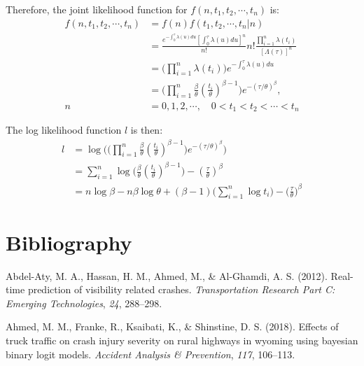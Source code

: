 \documentclass[12pt]{book}
\numberwithin{equation}{chapter}
\begin{document}
Therefore, the joint likelihood function for \(f(n, t_1, t_2, \cdots, t_n)\) is:
\begin{equation}
\begin{aligned}
f(n, t_1, t_2, \cdots, t_n) & = f(n)f(t_1, t_2, \cdots, t_n|n)\\
& = \frac{e^{-\int_0^\tau \lambda(u)du}[\int_0^\tau \lambda(u)du]^n}{n!}n!\frac{\prod_{i=1}^n\lambda(t_i)}{[\Lambda(\tau)]^n}\\
& = \Big(\prod_{i=1}^n\lambda(t_i) \Big)e^{-\int_0^\tau \lambda(u)du}\\
& = \Big(\prod_{i=1}^n\frac{\beta}{\theta}(\frac{t_i}{\theta})^{\beta - 1} \Big)e^{-(\tau/\theta)^\beta},\\ 
n & = 0, 1, 2, \cdots, \quad  0 < t_1 < t_2 < \cdots < t_n
\end{aligned}
\end{equation}

The log likelihood function \(l\) is then:
\begin{equation}
\begin{aligned}
l & = \log \Bigg(\Big(\prod_{i=1}^n\frac{\beta}{\theta}(\frac{t_i}{\theta})^{\beta - 1}\Big)e^{-(\tau/\theta)^\beta}\Bigg)\\
& = \sum_{i=1}^n\log\Big(\frac{\beta}{\theta}(\frac{t_i}{\theta})^{\beta - 1}\Big) - (\frac{\tau}{\theta})^\beta\\
& = n\log\beta - n\beta\log\theta + (\beta - 1)\bigg(\sum_{i=1}^n\log t_i\bigg) - \Big(\frac{\tau}{\theta}\Big)^\beta
\end{aligned}
\end{equation}

\cleardoublepage
\singlespacing

\hypertarget{bibliography}{%
\chapter*{Bibliography}\label{bibliography}}


\hypertarget{refs}{}
\leavevmode\hypertarget{ref-abdel2012real}{}%
Abdel-Aty, M. A., Hassan, H. M., Ahmed, M., \& Al-Ghamdi, A. S. (2012). Real-time prediction of visibility related crashes. \emph{Transportation Research Part C: Emerging Technologies}, \emph{24}, 288--298.

\leavevmode\hypertarget{ref-ahmed2018effects}{}%
Ahmed, M. M., Franke, R., Ksaibati, K., \& Shinstine, D. S. (2018). Effects of truck traffic on crash injury severity on rural highways in wyoming using bayesian binary logit models. \emph{Accident Analysis \& Prevention}, \emph{117}, 106--113.
\end{document}

